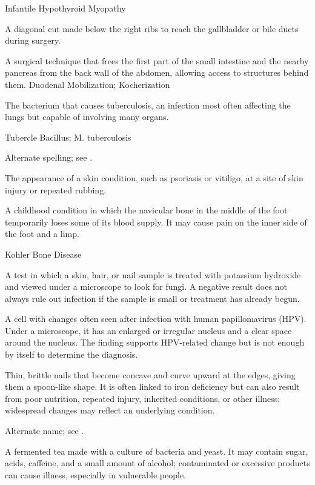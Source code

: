 \synonyms
Infantile Hypothyroid Myopathy

 A diagonal cut made below the right ribs to reach the gallbladder or bile ducts during surgery.

 A surgical technique that frees the first part of the small intestine and the nearby pancreas from the back wall of the abdomen, allowing access to structures behind them.
\synonyms
Duodenal Mobilization; Kocherization

 The bacterium that causes tuberculosis, an infection most often affecting the lungs but capable of involving many organs.

\synonyms
Tubercle Bacillus; M. tuberculosis

 Alternate spelling; see .

 The appearance of a skin condition, such as psoriasis or vitiligo, at a site of skin injury or repeated rubbing.

 A childhood condition in which the navicular bone in the middle of the foot temporarily loses some of its blood supply. It may cause pain on the inner side of the foot and a limp.

\synonyms
Kohler Bone Disease

 A test in which a skin, hair, or nail sample is treated with potassium hydroxide and viewed under a microscope to look for fungi. A negative result does not always rule out infection if the sample is small or treatment has already begun.

 A cell with changes often seen after infection with human papillomavirus (HPV). Under a microscope, it has an enlarged or irregular nucleus and a clear space around the nucleus. The finding supports HPV-related change but is not enough by itself to determine the diagnosis.

 Thin, brittle nails that become concave and curve upward at the edges, giving them a spoon-like shape. It is often linked to iron deficiency but can also result from poor nutrition, repeated injury, inherited conditions, or other illness; widespread changes may reflect an underlying condition.

 Alternate name; see
  .

 A fermented tea made with a culture of bacteria and yeast. It may contain sugar, acids, caffeine, and a small amount of alcohol; contaminated or excessive products can cause illness, especially in vulnerable people.

